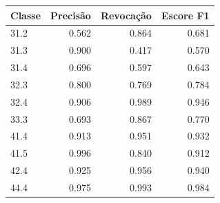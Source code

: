     \begin{tabular}{lrrr}
        \toprule
        \textbf{Classe} & \textbf{Precisão} & \textbf{Revocação} & \textbf{Escore F1} \\
        \midrule
        31.2 & 0.562 & 0.864 & 0.681 \\
        31.3 & 0.900 & 0.417 & 0.570 \\
        31.4 & 0.696 & 0.597 & 0.643 \\
        32.3 & 0.800 & 0.769 & 0.784 \\
        32.4 & 0.906 & 0.989 & 0.946 \\
        33.3 & 0.693 & 0.867 & 0.770 \\
        41.4 & 0.913 & 0.951 & 0.932 \\
        41.5 & 0.996 & 0.840 & 0.912 \\
        42.4 & 0.925 & 0.956 & 0.940 \\
        44.4 & 0.975 & 0.993 & 0.984 \\
        \bottomrule
    \end{tabular}